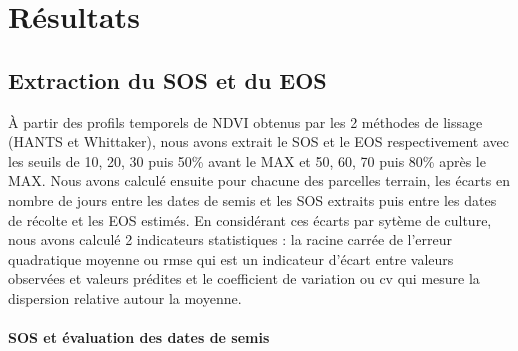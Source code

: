 \section{Résultats}

\subsection{Extraction du SOS et du EOS}

\`A partir des profils temporels de NDVI obtenus par les 2 méthodes de lissage (HANTS et Whittaker), nous avons extrait le SOS et le EOS respectivement avec les seuils de 10, 20, 30 puis 50\% avant le MAX et 50, 60, 70 puis 80\% après le MAX. Nous avons calculé ensuite pour chacune des parcelles terrain, les écarts en nombre de jours entre les dates de semis et les SOS extraits puis entre les dates de récolte et les EOS estimés. En considérant ces écarts par sytème de culture, nous avons calculé 2 indicateurs statistiques : la racine carrée de l'erreur quadratique moyenne ou \acrshort{rmse} qui est un indicateur d'écart entre valeurs observées et valeurs prédites et le coefficient de variation ou \acrshort{cv} qui mesure la dispersion relative autour la moyenne. 

\paragraph{SOS et évaluation des dates de semis}

